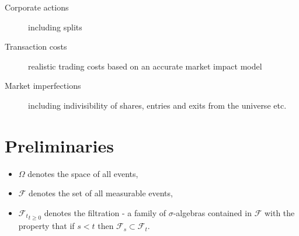 \documentclass[british]{amsart}
\numberwithin{equation}{section}
\numberwithin{figure}{section}
\theoremstyle{plain}
\theoremstyle{definition}
\theoremstyle{plain}
\theoremstyle{plain}
\theoremstyle{plain}
\theoremstyle{remark}
\theoremstyle{plain}
\newcommand{\filtration}[1]{\mathcal{F_{#1}}}
\begin{document}
% 
% 
% 
% 

\begin{description}
	\item [Corporate actions] including splits
	\item [Transaction costs] realistic trading costs based on an accurate 
		market impact model
	\item [Market imperfections] including indivisibility of shares, entries 
		and exits from the universe etc.
\end{description}

\section{Preliminaries}


\begin{itemize}
	\item $\Omega$ denotes the space of all events,
	\item $\mathcal{F}$ denotes the set of all measurable events,
	\item ${ \mathcal{F}_{t}} _{t\ge0}$ denotes the filtration
		- a family of $\sigma$-algebras contained in $\mathcal{F}$ with
		the property that if $s<t$ then $\mathcal{F}_{s}\subset\mathcal{F}_{t}$. 
\end{itemize}
\end{document}
